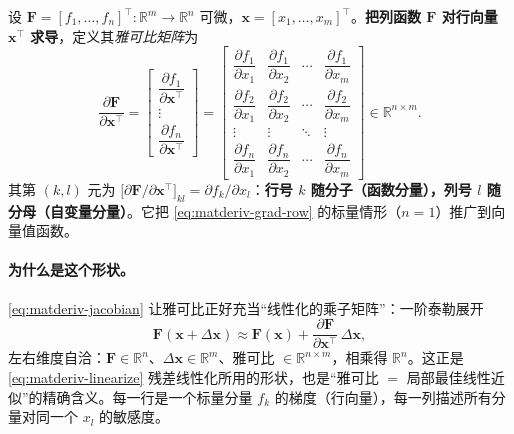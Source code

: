 \begin{definition}\label{def:matderiv-jacobian}
设 $\mathbf{F}=[f_1,\dots,f_n]^\top:\mathbb{R}^m\to\mathbb{R}^n$ 可微，$\mathbf{x}=[x_1,\dots,x_m]^\top$。\textbf{把列函数 $\mathbf{F}$ 对行向量 $\mathbf{x}^\top$ 求导}，定义其\emph{雅可比矩阵}为
\begin{equation}
  \frac{\partial\mathbf{F}}{\partial\mathbf{x}^\top}
  =\begin{bmatrix}
    \dfrac{\partial f_1}{\partial\mathbf{x}^\top}\\[1.2ex]
    \vdots\\[0.6ex]
    \dfrac{\partial f_n}{\partial\mathbf{x}^\top}
  \end{bmatrix}
  =\begin{bmatrix}
    \dfrac{\partial f_1}{\partial x_1} & \dfrac{\partial f_1}{\partial x_2} & \cdots & \dfrac{\partial f_1}{\partial x_m}\\[1.4ex]
    \dfrac{\partial f_2}{\partial x_1} & \dfrac{\partial f_2}{\partial x_2} & \cdots & \dfrac{\partial f_2}{\partial x_m}\\[1.4ex]
    \vdots & \vdots & \ddots & \vdots\\[0.6ex]
    \dfrac{\partial f_n}{\partial x_1} & \dfrac{\partial f_n}{\partial x_2} & \cdots & \dfrac{\partial f_n}{\partial x_m}
  \end{bmatrix}\in\mathbb{R}^{n\times m}.
  \label{eq:matderiv-jacobian}
\end{equation}
其第 $(k,l)$ 元为 $\big[\partial\mathbf{F}/\partial\mathbf{x}^\top\big]_{kl}=\partial f_k/\partial x_l$：\textbf{行号 $k$ 随分子（函数分量），列号 $l$ 随分母（自变量分量）}。它把 \cref{eq:matderiv-grad-row} 的标量情形（$n=1$）推广到向量值函数。
\end{definition}

\paragraph{为什么是这个形状。}
\cref{eq:matderiv-jacobian} 让雅可比正好充当“线性化的乘子矩阵”：一阶泰勒展开
\begin{equation}
  \mathbf{F}(\mathbf{x}+\Delta\mathbf{x})\approx\mathbf{F}(\mathbf{x})+\frac{\partial\mathbf{F}}{\partial\mathbf{x}^\top}\,\Delta\mathbf{x},
  \label{eq:matderiv-taylor}
\end{equation}
左右维度自洽：$\mathbf{F}\in\mathbb{R}^n$、$\Delta\mathbf{x}\in\mathbb{R}^m$、雅可比 $\in\mathbb{R}^{n\times m}$，相乘得 $\mathbb{R}^n$。这正是 \cref{eq:matderiv-linearize} 残差线性化所用的形状，也是“雅可比 $=$ 局部最佳线性近似”的精确含义。每一行是一个标量分量 $f_k$ 的梯度（行向量），每一列描述所有分量对同一个 $x_l$ 的敏感度。

